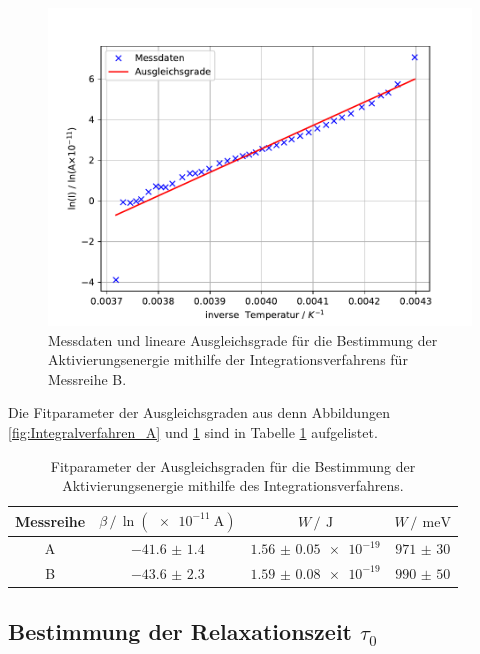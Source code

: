 \begin{figure}
    \centering
    \includegraphics[width= \textwidth,keepaspectratio]{figure/Integralverfahren_B.pdf}
    \caption{Messdaten und lineare Ausgleichsgrade für die Bestimmung der Aktivierungsenergie mithilfe der Integrationsverfahrens für Messreihe B.}
    \label{fig:Integralverfahren_B}
\end{figure}
\FloatBarrier
Die Fitparameter der Ausgleichsgraden aus denn Abbildungen \ref{fig:Integralverfahren_A} und \ref{fig:Integralverfahren_B} sind 
in Tabelle \ref{tab:Fit_params_integtal} aufgelistet.
\begin{table}
    \centering
    \caption{Fitparameter der Ausgleichsgraden für die Bestimmung der Aktivierungsenergie mithilfe des Integrationsverfahrens.}
    \label{tab:Fit_params_integtal}
    \begin{tabular}{c c c c}
        \toprule
        Messreihe&$\beta \,/\, \ln(\SI{e-11}{\ampere})$&$W \,/\,\SI{}{\joule}$&$W \,/\,\SI{}{\milli\eV}$\\
        \midrule
        A&$\num{-41.6(14)}$&$\num{1.56(5)e-19}$&$\num{971(30)}$\\
        B&$\num{-43.6(23)}$&$\num{1.59(8)e-19}$&$\num{990(50)}$\\
        \bottomrule
    \end{tabular}
\end{table}
\subsection{Bestimmung der Relaxationszeit \texorpdfstring{$\tau_{0}$}{T1}}

























